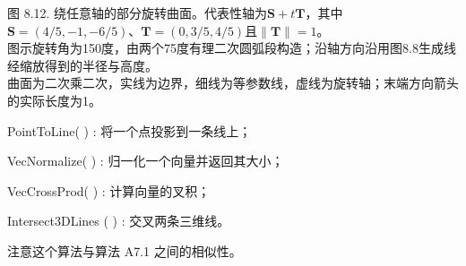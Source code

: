 \documentclass[../main.tex]{subfiles}
\begin{document}
\begin{center}
\begin{minipage}{27cm}
\vspace*{.6\baselineskip}
\centering
{}
\par\smallskip
图 8.12. 绕任意轴的部分旋转曲面。代表性轴为$\mathbf S+t\mathbf T$，其中$\mathbf S=(4/5,-1,-6/5)$、$\mathbf T=(0,3/5,4/5)$且$\|\mathbf T\|=1$。\\
图示旋转角为150度，由两个75度有理二次圆弧段构造；沿轴方向沿用图8.8生成线经缩放得到的半径与高度。\\
曲面为二次乘二次，实线为边界，细线为等参数线，虚线为旋转轴；末端方向箭头的实际长度为1。
\end{minipage}
\end{center}

PointToLine(   ) : 将一个点投影到一条线上；

VecNormalize(   ) : 归一化一个向量并返回其大小；

VecCrossProd(   ) : 计算向量的叉积；

Intersect3DLines (   ) : 交叉两条三维线。

注意这个算法与算法 A7.1 之间的相似性。
\end{document}
